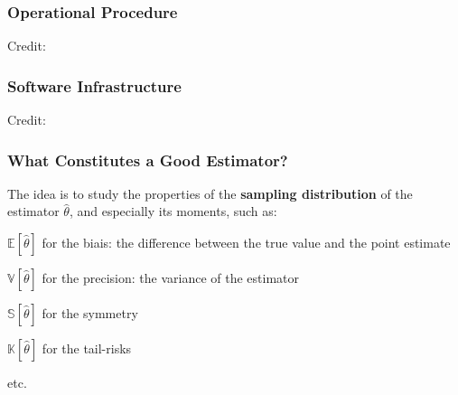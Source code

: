 \documentclass{beamer}
\newenvironment{wideitemize}{\itemize\addtolength{\itemsep}{10pt}}{\enditemize}
\begin{document}
\begin{frame}
  \frametitle{Operational Procedure}
  \hspace*{15pt}\hbox{\scriptsize Credit:}
\end{frame}



\begin{frame}
  \frametitle{Software Infrastructure}
  \hspace*{15pt}\hbox{\scriptsize Credit:}

\end{frame}

\begin{frame}
    \frametitle{What Constitutes a Good Estimator?}
    The idea is to study the properties of the \textbf{sampling distribution} of the estimator $\hat{\theta}$, and especially its moments, such as:\\

    \medskip

    \begin{wideitemize}
    \item $\mathbb{E}[\hat{\theta}]$ for the biais: the difference between the true value and the point estimate
    \item $\mathbb{V}[\hat{\theta}]$ for the precision: the variance of the estimator
    \item $\mathbb{S}[\hat{\theta}]$ for the symmetry
    \item $\mathbb{K}[\hat{\theta}]$ for the tail-risks  
    \item etc.
    \end{wideitemize}
  \end{frame}
\end{document}

